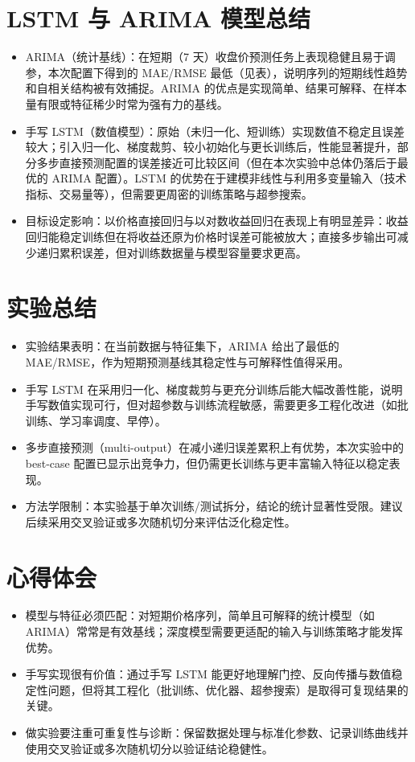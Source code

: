 \section{LSTM 与 ARIMA 模型总结}

\begin{itemize}
    \item ARIMA（统计基线）：在短期（7 天）收盘价预测任务上表现稳健且易于调参，本次配置下得到的 MAE/RMSE 最低（见表），说明序列的短期线性趋势和自相关结构被有效捕捉。ARIMA 的优点是实现简单、结果可解释、在样本量有限或特征稀少时常为强有力的基线。
    \item 手写 LSTM（数值模型）：原始（未归一化、短训练）实现数值不稳定且误差较大；引入归一化、梯度裁剪、较小初始化与更长训练后，性能显著提升，部分多步直接预测配置的误差接近可比较区间（但在本次实验中总体仍落后于最优的 ARIMA 配置）。LSTM 的优势在于建模非线性与利用多变量输入（技术指标、交易量等），但需要更周密的训练策略与超参搜索。
    \item 目标设定影响：以价格直接回归与以对数收益回归在表现上有明显差异：收益回归能稳定训练但在将收益还原为价格时误差可能被放大；直接多步输出可减少递归累积误差，但对训练数据量与模型容量要求更高。
\end{itemize}

\section{实验总结}
\begin{itemize}
    \item 实验结果表明：在当前数据与特征集下，ARIMA 给出了最低的 MAE/RMSE，作为短期预测基线其稳定性与可解释性值得采用。
    \item 手写 LSTM 在采用归一化、梯度裁剪与更充分训练后能大幅改善性能，说明手写数值实现可行，但对超参数与训练流程敏感，需要更多工程化改进（如批训练、学习率调度、早停）。
    \item 多步直接预测（multi-output）在减小递归误差累积上有优势，本次实验中的 best-case 配置已显示出竞争力，但仍需更长训练与更丰富输入特征以稳定表现。
    \item 方法学限制：本实验基于单次训练/测试拆分，结论的统计显著性受限。建议后续采用交叉验证或多次随机切分来评估泛化稳定性。
\end{itemize}

\section{心得体会}

\begin{itemize}
    \item 模型与特征必须匹配：对短期价格序列，简单且可解释的统计模型（如 ARIMA）常常是有效基线；深度模型需要更适配的输入与训练策略才能发挥优势。
    \item 手写实现很有价值：通过手写 LSTM 能更好地理解门控、反向传播与数值稳定性问题，但将其工程化（批训练、优化器、超参搜索）是取得可复现结果的关键。
    \item 做实验要注重可重复性与诊断：保留数据处理与标准化参数、记录训练曲线并使用交叉验证或多次随机切分以验证结论稳健性。
\end{itemize}
